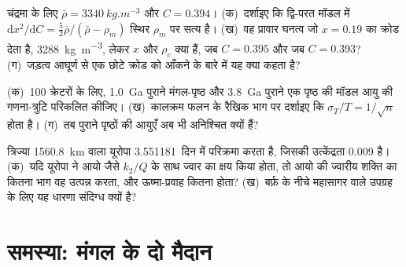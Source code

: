 \begin{exercise}[$\star\star\star$]\label{exo:b3:planetary-interiors-surfaces:10}
चंद्रमा के लिए $\bar\rho = \qty{3340}{kg.m^{-3}}$ और $C = 0.394$।
(क)~दर्शाइए कि द्वि-परत मॉडल में $\mathrm dx^2/\mathrm dC =
\tfrac52\bar\rho/(\bar\rho - \rho_m)$ स्थिर $\rho_m$ पर सत्य है। (ख)~वह प्रावार घनत्व
जो $x = 0.19$ का क्रोड देता है, \qty{3288}{kg.m^{-3}}, लेकर
$x$ और $\rho_c$ क्या हैं, जब $C = 0.395$ और जब $C = 0.393$?
(ग)~जड़त्व आघूर्ण से एक छोटे क्रोड को आँकने के बारे में यह
क्या कहता है?
\end{exercise}

\begin{exercise}[$\star\star\star$]\label{exo:b3:planetary-interiors-surfaces:11}
(क)~100 क्रेटरों के लिए, \qty{1.0}{Ga} पुराने मंगल-पृष्ठ और
\qty{3.8}{Ga} पुराने एक पृष्ठ की मॉडल आयु की गणना-त्रुटि परिकलित कीजिए।
(ख)~कालक्रम फलन के रैखिक भाग पर दर्शाइए कि $\sigma_T/T =
1/\sqrt n$ होता है। (ग)~तब पुराने पृष्ठों की आयुएँ अब भी अनिश्चित क्यों हैं?
\end{exercise}

\begin{exercise}[$\star\star\star$]\label{exo:b3:planetary-interiors-surfaces:12}
त्रिज्या \qty{1560.8}{km} वाला यूरोपा \num{3.551181}~दिन में परिक्रमा करता है,
जिसकी उत्केंद्रता 0.009 है। (क)~यदि यूरोपा ने आयो जैसे $k_2/Q$ के साथ ज्वार का क्षय किया होता,
तो आयो की ज्वारीय शक्ति का कितना भाग वह उत्पन्न करता, और ऊष्मा-प्रवाह कितना होता?
(ख)~बर्फ़ के नीचे महासागर वाले उपग्रह के लिए यह धारणा संदिग्ध क्यों है?
\end{exercise}

\section{समस्या: मंगल के दो मैदान}

